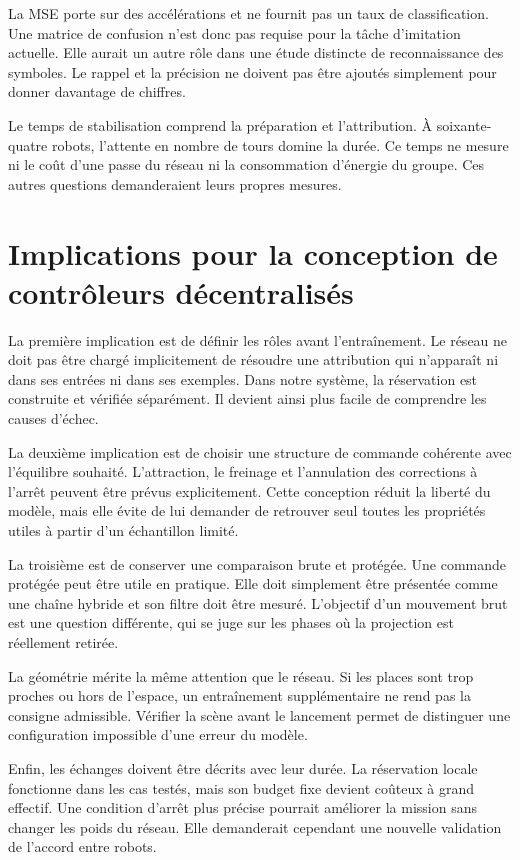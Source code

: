 La MSE porte sur des accélérations et ne fournit pas un taux de classification. Une matrice de confusion n'est donc pas requise pour la tâche d'imitation actuelle. Elle aurait un autre rôle dans une étude distincte de reconnaissance des symboles. Le rappel et la précision ne doivent pas être ajoutés simplement pour donner davantage de chiffres.

Le temps de stabilisation comprend la préparation et l'attribution. À soixante-quatre robots, l'attente en nombre de tours domine la durée. Ce temps ne mesure ni le coût d'une passe du réseau ni la consommation d'énergie du groupe. Ces autres questions demanderaient leurs propres mesures.

\section*{Implications pour la conception de contrôleurs décentralisés}
{}
La première implication est de définir les rôles avant l'entraînement. Le réseau ne doit pas être chargé implicitement de résoudre une attribution qui n'apparaît ni dans ses entrées ni dans ses exemples. Dans notre système, la réservation est construite et vérifiée séparément. Il devient ainsi plus facile de comprendre les causes d'échec.

La deuxième implication est de choisir une structure de commande cohérente avec l'équilibre souhaité. L'attraction, le freinage et l'annulation des corrections à l'arrêt peuvent être prévus explicitement. Cette conception réduit la liberté du modèle, mais elle évite de lui demander de retrouver seul toutes les propriétés utiles à partir d'un échantillon limité.

La troisième est de conserver une comparaison brute et protégée. Une commande protégée peut être utile en pratique. Elle doit simplement être présentée comme une chaîne hybride et son filtre doit être mesuré. L'objectif d'un mouvement brut est une question différente, qui se juge sur les phases où la projection est réellement retirée.

La géométrie mérite la même attention que le réseau. Si les places sont trop proches ou hors de l'espace, un entraînement supplémentaire ne rend pas la consigne admissible. Vérifier la scène avant le lancement permet de distinguer une configuration impossible d'une erreur du modèle.

Enfin, les échanges doivent être décrits avec leur durée. La réservation locale fonctionne dans les cas testés, mais son budget fixe devient coûteux à grand effectif. Une condition d'arrêt plus précise pourrait améliorer la mission sans changer les poids du réseau. Elle demanderait cependant une nouvelle validation de l'accord entre robots.

